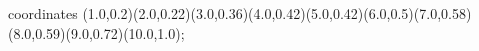 					coordinates { (1.0,0.2)(2.0,0.22)(3.0,0.36)(4.0,0.42)(5.0,0.42)(6.0,0.5)(7.0,0.58)(8.0,0.59)(9.0,0.72)(10.0,1.0)};